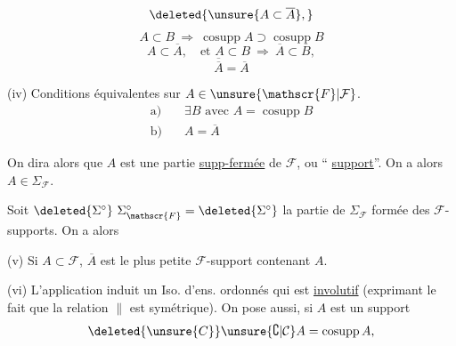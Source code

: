 
\[
\deleted{\unsure{A\subset\overline A},}
\]
\[
A\subset B\ \Longrightarrow\ \operatorname{cosupp}A\supset\operatorname{cosupp}B
\tag*{(i)}
\]
\[
A\subset\overline A,\quad\text{et }A\subset B\ \Longrightarrow\ \overline A\subset\overline B,
\tag*{(ii)}
\]
\[
\overline{\overline A}=\overline A
\tag*{(iii)}
\]

(iv) Conditions équivalentes sur $A\in\unsure{\mathscr{F}|\mathcal{F}}$.
\[
\begin{aligned}
\text{a)}\quad&\exists B\text{ avec }A=\operatorname{cosupp}B\\
\text{b)}\quad&A=\overline A
\end{aligned}
\]

On dira alors que $A$ est une partie \uline{supp-fermée} de $\mathscr{F}$,  ou `` \uline{support}''.  On a alors $A\in\Sigma_{\mathscr{F}}$.


Soit $\deleted{\Sigma^\circ}\ \Sigma_{\mathscr{F}}^\circ=\deleted{\Sigma^\circ}$ la partie de $\Sigma_{\mathscr{F}}$ formée des  $\mathscr{F}$-supports. On a alors

(v) Si $A\subset\mathscr{F}$, $\overline A$ est le plus petite   $\mathscr{F}$-support contenant $A$.

(vi) L'application
induit un  Iso. d'ens. ordonnés
qui est \uline{involutif} (exprimant le fait que la relation $\parallel$ est symétrique). On pose aussi, si $A$ est un support
\[
\deleted{\unsure{C}}\unsure{\complement|\mathcal{C}}A=\operatorname{cosupp}A,
\]
